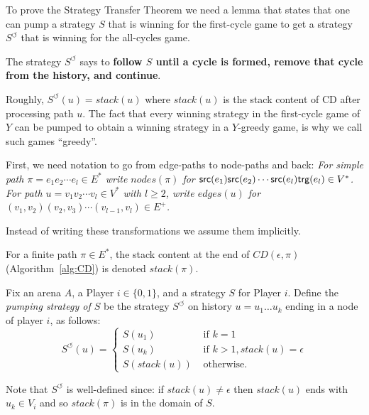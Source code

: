 \documentclass[a4paper,10pt]{article}
\begin{document}
\def\pumpS{S^{\circlearrowleft}}
\def\pump{\circlearrowleft}

To prove the Strategy Transfer Theorem we need a lemma that states that one can pump a strategy $S$ that is winning for the first-cycle game to get a strategy $\pumpS$ that is winning for the all-cycles game.

The strategy $\pumpS$ says to \textbf{follow $S$ until a cycle is formed, remove that cycle from the history, and continue}. 

Roughly, $\pumpS(u) = stack(u)$ where $stack(u)$ is the stack content of CD after processing path $u$. The fact that every winning strategy in the first-cycle game of $Y$ can be pumped to obtain a winning strategy in a $Y$-greedy game, is why we call such games ``greedy''.


\cbstart
First, we need notation to go from edge-paths to node-paths and back: 
\it
\- For simple path $\pi = e_1 e_2 \cdots e_l \in E^*$ write $nodes(\pi)$ for $\textsf{src}(e_1) \textsf{src}(e_2) \cdots \textsf{src}(e_l)\textsf{trg}(e_l) \in V^*$. 
\- For path $u = v_1 v_2 \cdots v_l \in V^*$ with $l \geq 2$, write $edges(u)$ for $(v_1,v_2) (v_2,v_3) \cdots (v_{l-1},v_l) \in E^+$. 
\ti

Instead of writing these transformations we assume them implicitly.

\begin{definition}\label{dfn:pumping}
For a finite path $\pi \in E^*$, the stack content at the end of $CD(\epsilon,\pi)$ (Algorithm~\ref{alg:CD}) is denoted $stack(\pi)$. 

Fix an arena $A$,  a Player $i \in \{0,1\}$, and a strategy $S$ for Player $i$. Define the {\em pumping strategy of $S$} be the strategy $\pumpS$ 
on history $u = u_1 \dots u_k$ ending in a node of player $i$, as follows:
\[ 
\pumpS(u) =
	\begin{cases}
	S(u_1) & \mbox{ if } k = 1\\
	S(u_k) & \mbox{ if } k > 1, stack(u) = \epsilon\\
	S(stack(u)) & \mbox{ otherwise.}
	\end{cases}
\]
\end{definition}

Note that $\pumpS$ is well-defined since: if $stack(u) \neq \epsilon$ then $stack(u)$ ends with $u_k \in V_i$ and so $stack(\pi)$ is in the domain of $S$. 
\end{document}

